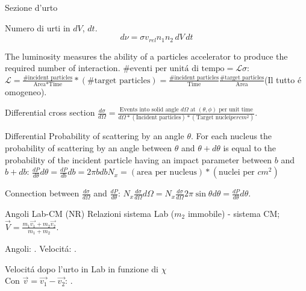 \begin{frame}{Sezione d'urto}
\begin{block}{Numero di urti in $dV$, $dt$.}
\begin{equation*}
    d\nu=\sigma v_{rel}n_1n_2\,dV\,dt
\end{equation*}

The luminosity measures the ability of a particles accelerator to produce the required number of interaction.
 $\# \text{eventi per unit\'a di tempo}=\mathcal{L}\sigma$:\\
$\mathcal{L}=\frac{\text{\# incident particles}}{\text{Area}*\text{Time}}*(\text{\# target particles})=\frac{\text{\# incident particles}}{\text{Time}}\frac{\text{\# target particles}}{\text{Area}}$(Il tutto \'e omogeneo).
\end{block}

\begin{block}{Differential cross section}
$\frac{d\sigma}{d\Omega}=\frac{\text{Events into solid angle $d\Omega$ at $(\theta,\phi)$ per unit time}}{d\Omega*(\text{Incident particles})*(\text{Target nuclei} per cm^2)}$.

Differential Probability of scattering by an angle $\theta$. For each nucleus the probability of scattering by an angle between $\theta$ and $\theta+d\theta$ is equal to the probability of the incident particle having an impact parameter between $b$ and $b+db$: $\frac{dP}{d\theta}d\theta=\frac{dP}{db}db=2\pi bdbN_x=(\text{area per nucleus})*(\text{nuclei per }cm^2)$
\end{block}
Connection between $\frac{d\sigma}{d\Omega}$ and $\frac{dP}{d\theta}$: $N_x\frac{d\sigma}{d\Omega}d\Omega=N_x\frac{d\sigma}{d\Omega}2\pi\sin{\theta}d\theta=\frac{dP}{d\theta}d\theta$.
\end{frame}

\begin{wordonframe}{Angoli Lab-CM (NR)}
    Relazioni sistema Lab ($m_2$ immobile) - sistema CM; $\vec{V}=\frac{m_1\vec{v_1}+m_2\vec{v_2}}{m_1+m_2}$.

Angoli: .
Velocit\'a: .

Velocit\'a dopo l'urto in Lab in funzione di $\chi$\\
Con $\vec{v}=\vec{v_1}-\vec{v_2}$: 
.

\end{wordonframe}

